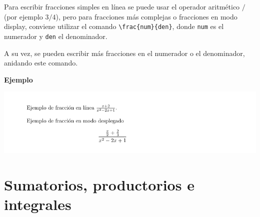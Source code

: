 \documentclass[
  letterpaper,
  DIV=11,
  numbers=noendperiod]{scrreport}
\newenvironment{Shaded}{\begin{snugshade}}{\end{snugshade}}
\newcommand{\CommentTok}[1]{\textcolor[rgb]{0.37,0.37,0.37}{#1}}
\newcommand{\ExtensionTok}[1]{\textcolor[rgb]{0.00,0.23,0.31}{#1}}
\newcommand{\KeywordTok}[1]{\textcolor[rgb]{0.00,0.23,0.31}{#1}}
\newcommand{\NormalTok}[1]{\textcolor[rgb]{0.00,0.23,0.31}{#1}}
\newcommand{\SpecialCharTok}[1]{\textcolor[rgb]{0.37,0.37,0.37}{#1}}
\newcommand{\SpecialStringTok}[1]{\textcolor[rgb]{0.13,0.47,0.30}{#1}}
\begin{document}
Para escribir fracciones simples en línea se puede usar el operador
aritmético \(/\) (por ejemplo \(3/4\)), pero para fracciones más
complejas o fracciones en modo display, conviene utilizar el comando
\texttt{\textbackslash{}frac\{num\}\{den\}}, donde \texttt{num} es el
numerador y \texttt{den} el denominador.

A su vez, se pueden escribir más fracciones en el numerador o el
denominador, anidando este comando.

\textbf{Ejemplo}

\begin{Shaded}
\end{Shaded}

\begin{tcolorbox}[enhanced jigsaw, opacitybacktitle=0.6, coltitle=black, colbacktitle=quarto-callout-note-color!10!white, title={Salida}, colback=white, toprule=.15mm, breakable, opacityback=0, left=2mm, rightrule=.15mm, toptitle=1mm, colframe=quarto-callout-note-color-frame, bottomtitle=1mm, titlerule=0mm, arc=.35mm, bottomrule=.15mm, leftrule=.75mm]
\includegraphics{./img/formulas/fracciones.png}
\end{tcolorbox}

\hypertarget{sumatorios-productorios-e-integrales}{%
\section{Sumatorios, productorios e
integrales}\label{sumatorios-productorios-e-integrales}}
\end{document}
